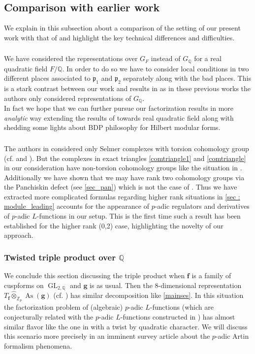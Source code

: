 \documentclass[10pt]{amsart}
\numberwithin{equation}{section}
\theoremstyle{definition}
\theoremstyle{remark} %
\newcommand{\As}{\operatorname{As}}
\newcommand{\GL}[1]{\operatorname{GL}_{#1}}
\newcommand{\f}{\mathbf{f}}
\newcommand{\g}{\mathbf{g}}
\newcommand{\p}{\mathfrak{p}}
\newcommand{\Q}{\mathbb{Q}}
\newcommand{\Zp}{\mathbb{Z}_p}
\newcommand{\hotimes}{\widehat{\otimes}}
\begin{document}
	\subsection{Comparison with earlier work}
	\label{sec:comparison}
	We explain in this subsection about a comparison of the setting of our present work with that of \cite{Greenberg1982, Palva18, BCS23} and highlight the key technical differences and difficulties.
	\subsubsection{}
	We have considered the representations over $ G_F $ instead of $ G_\Q $ for a real quadratic field $ F/\Q $. In order to do so we have to consider local conditions in two different places associated to $ \p_1 $ and $ \p_2 $ separately along with the bad places. This is a stark contrast between our work and results in \cite{Greenberg1982, Palva18, BCS23} as in these previous works the authors only considered representations of $ G_\Q $. \\
	In fact we hope that we can further pursue our factorization results in more \emph{analytic} way extending the results of \cite{Gross80,Dasgupta16,2024artinformalismtripleproduct} towards real quadratic field along with shedding some lights about BDP philosophy for Hilbert modular forms.
	\subsubsection{}
	The authors in \cite{Greenberg1982, Palva18} considered only Selmer complexes with torsion cohomology group (cf. \cite[Apendix A]{BCS23} and \cite[.3]{BCS23}). But the complexes in exact triangles \eqref{comtriangle1} and \eqref{comtriangle} in our consideration have non-torsion cohomology groups like the situation in \cite{BCS23}. Additionally we have shown that we may have rank two cohomology groups via the Panchiskin defect (see \textsection \ref{sec_pan}) which is not the case of \cite{BCS23}. Thus we have extracted more complicated formulas regarding higher rank situations in \textsection \ref{sec : module_leading} accounts for	the appearance of $p$-adic regulators and derivatives of $p$-adic $L$-functions in our setup. This is the first time such a result has been established for the higher rank (0,2) case, highlighting the novelty of our approach.
	\subsubsection{Twisted triple product over $ \Q $}
	We conclude this section discussing the triple product when $ \f $ is a family of cuspforms on $ \GL{2,\Q} $ and $ \g $ is as usual. Then the $ 8 $-dimensional representation $ T_\f \hotimes_{\Zp} \As(\g) $ (cf. \cite[Definition 6.4]{ForneaJin}) has similar decomposition like \eqref{mainses}. In this situation the factorization problem of (algebraic) $p$-adic $L$-functions (which are conjecturally related with the $ p $-adic $ L $-functions constructed in \cite{BCF}) has almost similar flavor like the one in \cite{BCS23} with a twist by quadratic character. We will discuss this scenario more precisely in an imminent survey article about the $ p $-adic Artin formalism phenomena.     
	
\end{document}
